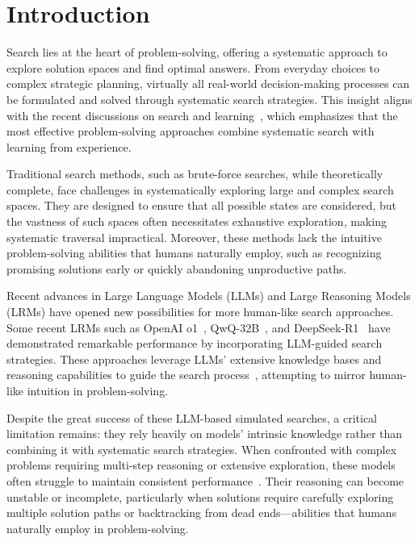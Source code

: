 \section{Introduction}
\label{sec:introduction}
Search lies at the heart of problem-solving, offering a systematic approach to explore solution spaces and find optimal answers. From everyday choices to complex strategic planning, virtually all real-world decision-making processes can be formulated and solved through systematic search strategies. This insight aligns with the recent discussions on search and learning~\cite{Sutton2019BitterLesson,snell2024scaling}, which emphasizes that the most effective problem-solving approaches combine systematic search with learning from experience.


Traditional search methods, such as brute-force searches, while theoretically complete, face challenges in systematically exploring large and complex search spaces.
They are designed to ensure that all possible states are considered, but the vastness of such spaces often necessitates exhaustive exploration, making systematic traversal impractical. Moreover, these methods lack the intuitive problem-solving abilities that humans naturally employ, such as recognizing promising solutions early or quickly abandoning unproductive paths.

Recent advances in Large Language Models (LLMs) and Large Reasoning Models (LRMs) have opened new possibilities for more human-like search approaches. Some recent LRMs such as OpenAI o1~\cite{openaio1card}, QwQ-32B~\cite{qwq-32b-preview}, and DeepSeek-R1~\cite{deepseekai2025deepseekr1} have demonstrated remarkable performance by incorporating LLM-guided search strategies. These approaches leverage LLMs' extensive knowledge bases and reasoning capabilities to guide the search process~\cite{wei2022chain,wang2023selfconsistency,snell2024scaling,yao2023tree,hao2023reasoning,wang2024litesearch}, attempting to mirror human-like intuition in problem-solving.

Despite the great success of these LLM-based simulated searches, a critical limitation remains: they rely heavily on models' intrinsic knowledge rather than combining it with systematic search strategies. When confronted with complex problems requiring multi-step reasoning or extensive exploration, these models often struggle to maintain consistent performance~\cite{wang2024q,wang2024multi,snell2024scaling}. Their reasoning can become unstable or incomplete, particularly when solutions require carefully exploring multiple solution paths or backtracking from dead ends—abilities that humans naturally employ in problem-solving.

